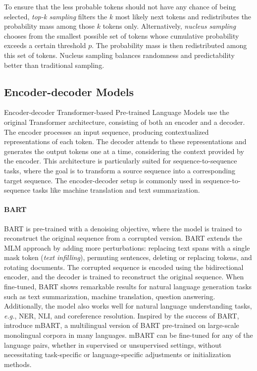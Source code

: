 To ensure that the less probable tokens should not have any chance of being selected, \textit{top-k sampling} \citep{fan2018hierarchical} filters the $k$ most likely next tokens and redistributes the probability mass among those $k$ tokens only. Alternatively, \textit{nucleus sampling} chooses from the smallest possible set of tokens whose cumulative probability exceeds a certain threshold $p$. The probability mass is then redistributed among this set of tokens. Nucleus sampling balances randomness and predictability better than traditional sampling.

\subsection{Encoder-decoder Models}
\label{subsection:related-pretrained-language-models-ed-models}

Encoder-decoder Transformer-based Pre-trained Language Models use the original Transformer architecture, consisting of both an encoder and a decoder. The encoder processes an input sequence, producing contextualized representations of each token. The decoder attends to these representations and generates the output tokens one at a time, considering the context provided by the encoder. This architecture is particularly suited for sequence-to-sequence tasks, where the goal is to transform a source sequence into a corresponding target sequence. The encoder-decoder setup is commonly used in sequence-to-sequence tasks like machine translation and text summarization.

\paragraph{BART} \ac{BART} \citep{lewis2019bart} is pre-trained with a denoising objective, where the model is trained to reconstruct the original sequence from a corrupted version. \ac{BART} extends the \ac{MLM} approach by adding more perturbations: replacing text spans with a single mask token (\textit{text infilling}), permuting sentences, deleting or replacing tokens, and rotating documents. The corrupted sequence is encoded using the bidirectional encoder, and the decoder is trained to reconstruct the original sequence. When fine-tuned, \ac{BART} shows remarkable results for natural language generation tasks such as text summarization, machine translation, question answering. Additionally, the model also works well for natural language understanding tasks, \textit{e.g.}, \ac{NER}, \ac{NLI}, and coreference resolution. Inspired by the success of \ac{BART}, \citet{liu2020multilingual} introduce mBART, a multilingual version of \ac{BART} pre-trained on large-scale monolingual corpora in many languages. mBART can be fine-tuned for any of the language pairs, whether in supervised or unsupervised settings, without necessitating task-specific or language-specific adjustments or initialization methods.

